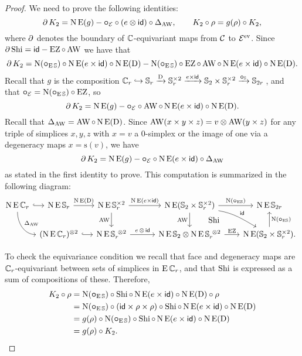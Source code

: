 \begin{proof}
	We need to prove the following identities:
	\[
	\bd K_2 = \chains\EE(g) - \bcomp_{\BE} \comp (e \ot \id) \comp \Delta_{\AW},
	\qquad
	K_2 \comp \rho = g(\rho) \comp K_2,
	\]
	where $\bd$ denotes the boundary of $\cyc$-equivariant maps from $\cC$ to $\BE^\ev$.
	Since $\bd \Shi = \id - \EZ \comp \AW$ we have that
	\[
	\bd K_2 =
	\chains(\bcomp_{\EE\sym}) \comp \chains\EE(e \times \id) \comp \chains\EE(\rD) -
	\chains(\bcomp_{\EE\sym}) \comp \EZ \comp \AW \comp \chains\EE(e \times \id) \comp \chains\EE(\rD).
	\]
	Recall that $g$ is the composition $\cyc_r \hookrightarrow \sym_r \xra{\rD} \sym_r^{\times 2} \xra{e \times \id} \sym_2 \times \sym_r^{\times 2} \xra{\bcomp_{\sym}} \sym_{2r}$\,, and that $\bcomp_{\BE} = \chains(\bcomp_{\EE\sym}) \comp \EZ$, so
	\[
	\bd K_2 =
	\chains\EE(g) -
	\bcomp_{\BE} \comp \AW \comp \chains\EE(e \times \id) \comp \chains\EE(\rD).
	\]
	Recall that $\Delta_{\AW} = \AW \comp \chains\EE(\rD)$.
	Since $\AW(x \times y \times z) = v \ot \AW(y \times z)$ for any triple of simplices $x,y,z$ with $x = v$ a $0$-simplex or the image of one via a degeneracy maps $x = \mathrm{s}(v)$, we have
	\[
	\bd K_2 =
	\chains\EE(g) -
	\bcomp_{\BE} \comp \chains\EE(e \times \id) \comp \Delta_{\AW}
	\]
	as stated in the first identity to prove.
	This computation is summarized in the following diagram:
	\[
	\hspace*{-4pt}
	\begin{tikzcd}
		\chains\EE\cyc_r
		\rar[hook]
		\arrow[dr,in=180,out=-90,"\Delta_{\AW}"]
		&[-20pt]
		\chains\EE\sym_r
		\rar["\chains\EE(\rD)"] &[-10pt]
		\chains\EE\sym_r^{\times 2}
		\rar["\chains\EE(e \times \id)"]
		\dar["\AW"'] &[7pt]
		\chains\EE(\sym_2 \times \sym_r^{\times 2})
		\rar["\chains(\bcomp_{\EE\!\sym})"]
		\dar["\AW"']
		\drar["\id",out=-10,in=150] &[-5pt]
		\chains\EE\sym_{2r} \\ &
		(\chains\EE\cyc_r)^{\ot 2}
		\arrow[r,hook] &
		\chains\EE\sym_r^{\ \ot 2}
		\rar["e \,\ot\, \id"] &
		\chains\EE\sym_2 \ot \chains\EE\sym_r^{\ \ot 2}
		\rar["\EZ"]
		\uar["\Shi",phantom,shift right=30pt] &
		\chains\EE(\sym_2 \times \sym_r^{\times 2}).
		\uar["\chains(\bcomp_{\EE\!\sym})"']
	\end{tikzcd}
	\]

	To check the equivariance condition we recall that face and degeneracy maps are $\cyc_r$-equivariant between sets of simplices in $\EE\cyc_r$, and that $\Shi$ is expressed as a sum of compositions of these.
	Therefore,
	\begin{align*}
		K_2 \comp \rho &=
		\chains(\bcomp_{\EE\sym}) \comp \Shi \comp \chains\EE(e \times \id) \comp \chains\EE(\rD) \comp \rho \\ &=
		\chains(\bcomp_{\EE\sym}) \comp (\id \times \rho \times \rho) \comp \Shi \comp \chains\EE(e \times \id) \comp \chains\EE(\rD) \\ &=
		g(\rho) \comp \chains(\bcomp_{\EE\sym}) \comp \Shi \comp \chains\EE(e \times \id) \comp \chains\EE(\rD) \\ &=
		g(\rho) \comp K_2. \qedhere
	\end{align*}
\end{proof}

